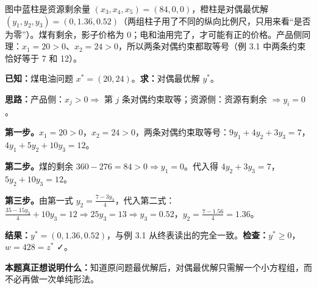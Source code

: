 \begin{figure}[!htbp]\centering
{}
\end{figure}

图中蓝柱是资源剩余量 $(x_3,x_4,x_5)=(84,0,0)$，橙柱是对偶最优解 $(y_1,y_2,y_3)=(0,1.36,0.52)$（两组柱子用了不同的纵向比例尺，只用来看“是否为零”）。煤有剩余，影子价格为 0；电和油用完了，才可能有正的价格。产品侧同理：$x_1=20>0$、$x_2=24>0$，所以两条对偶约束都取等号（例 3.1 中两条约束恰好等于 7 和 12）。

\begin{examplebox}
\textbf{已知：}煤电油问题 $x^*=(20,24)$。\quad\textbf{求：}对偶最优解 $y^*$。\par
\textbf{思路：}产品侧：$x_j>0\Rightarrow$ 第 $j$ 条对偶约束取等；资源侧：资源有剩余 $\Rightarrow y_i=0$。\par
\textbf{第一步。}$x_1=20>0$，$x_2=24>0$，两条对偶约束取等号：$9y_1+4y_2+3y_3=7$，$4y_1+5y_2+10y_3=12$。\par
\textbf{第二步。}煤的剩余 $360-276=84>0\Rightarrow y_1=0$。代入得 $4y_2+3y_3=7$，$5y_2+10y_3=12$。\par
\textbf{第三步。}由第一式 $y_2=\frac{7-3y_3}{4}$，代入第二式：$\frac{35-15y_3}{4}+10y_3=12\Rightarrow 25y_3=13\Rightarrow y_3=0.52$，$y_2=\frac{7-1.56}{4}=1.36$。\par
\textbf{结果：}$y^*=(0,1.36,0.52)$，与例 3.1 从终表读出的完全一致。\quad\textbf{检查：}$y^*\ge0$，$w=428=z^*$ ✓。\par
\textbf{本题真正想说明什么：}知道原问题最优解后，对偶最优解只需解一个小方程组，而不必再做一次单纯形法。
\end{examplebox}

